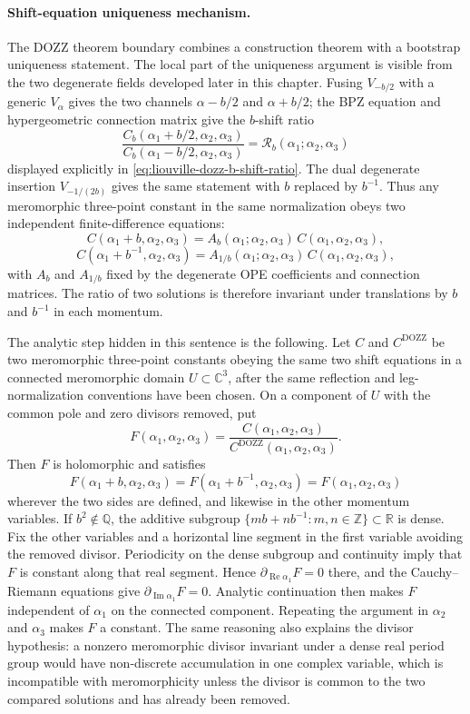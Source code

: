 \paragraph{Shift-equation uniqueness mechanism.}
The DOZZ theorem boundary combines a construction theorem with a bootstrap
uniqueness statement.  The local part of the uniqueness argument is visible
from the two degenerate fields developed later in this chapter.  Fusing
\(V_{-b/2}\) with a generic \(V_\alpha\) gives the two channels
\(\alpha-b/2\) and \(\alpha+b/2\); the BPZ equation and hypergeometric
connection matrix give the \(b\)-shift ratio
\[
  \frac{C_b(\alpha_1+b/2,\alpha_2,\alpha_3)}
       {C_b(\alpha_1-b/2,\alpha_2,\alpha_3)}
  =
  \mathcal R_b(\alpha_1;\alpha_2,\alpha_3)
\]
displayed explicitly in
\eqref{eq:liouville-dozz-b-shift-ratio}.  The dual degenerate insertion
\(V_{-1/(2b)}\) gives the same statement with \(b\) replaced by \(b^{-1}\).
Thus any meromorphic three-point constant in the same normalization obeys two
independent finite-difference equations:
\[
  C(\alpha_1+b,\alpha_2,\alpha_3)
  =
  A_b(\alpha_1;\alpha_2,\alpha_3)\,
  C(\alpha_1,\alpha_2,\alpha_3),
\]
\[
  C(\alpha_1+b^{-1},\alpha_2,\alpha_3)
  =
  A_{1/b}(\alpha_1;\alpha_2,\alpha_3)\,
  C(\alpha_1,\alpha_2,\alpha_3),
\]
with \(A_b\) and \(A_{1/b}\) fixed by the degenerate OPE coefficients and
connection matrices.  The ratio of two solutions is therefore invariant under
translations by \(b\) and \(b^{-1}\) in each momentum.

The analytic step hidden in this sentence is the following.  Let
\(C\) and \(C^{\mathrm{DOZZ}}\) be two meromorphic three-point constants
obeying the same two shift equations in a connected meromorphic domain
\(U\subset\mathbb C^3\), after the same reflection and leg-normalization
conventions have been chosen.  On a component of
\(U\) with the common pole and zero divisors removed, put
\[
  F(\alpha_1,\alpha_2,\alpha_3)
  =
  \frac{C(\alpha_1,\alpha_2,\alpha_3)}
       {C^{\mathrm{DOZZ}}(\alpha_1,\alpha_2,\alpha_3)} .
\]
Then \(F\) is holomorphic and satisfies
\[
  F(\alpha_1+b,\alpha_2,\alpha_3)
  =
  F(\alpha_1+b^{-1},\alpha_2,\alpha_3)
  =
  F(\alpha_1,\alpha_2,\alpha_3)
\]
wherever the two sides are defined, and likewise in the other momentum
variables.  If \(b^2\notin\mathbb Q\), the additive subgroup
\(\{mb+n b^{-1}:m,n\in\mathbb Z\}\subset\mathbb R\) is dense.  Fix the
other variables and a horizontal line segment in the first variable avoiding
the removed divisor.  Periodicity on the dense subgroup and continuity imply
that \(F\) is constant along that real segment.  Hence
\(\partial_{\operatorname{Re}\alpha_1}F=0\) there, and the Cauchy--Riemann
equations give \(\partial_{\operatorname{Im}\alpha_1}F=0\).  Analytic
continuation then makes \(F\) independent of \(\alpha_1\) on the connected
component.  Repeating the argument in \(\alpha_2\) and \(\alpha_3\) makes
\(F\) a constant.  The same reasoning also explains the divisor hypothesis:
a nonzero meromorphic divisor invariant under a dense real period group would
have non-discrete accumulation in one complex variable, which is incompatible
with meromorphicity unless the divisor is common to the two compared
solutions and has already been removed.

